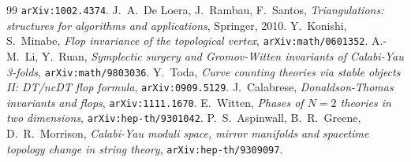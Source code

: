 \documentclass[11pt]{article}
\begin{document}
{\begin{thebibliography}{99}
\texttt{arXiv:1002.4374}.
 J.~A.~De Loera, J.~Rambau, F.~Santos, \textit{Triangulations: structures for
algorithms and applications}, Springer, 2010.
 Y.~Konishi, S.~Minabe, \textit{Flop invariance of the topological vertex},
\texttt{arXiv:math/0601352}.
 A.-M.~Li, Y.~Ruan, \textit{Symplectic surgery and Gromov-Witten invariants of
Calabi-Yau 3-folds},
\texttt{arXiv:math/9803036}.
 Y.~Toda, \textit{Curve counting theories via stable objects II: DT/ncDT flop
formula},
\texttt{arXiv:0909.5129}.
 J.~Calabrese, \textit{Donaldson-Thomas invariants and flops},
\texttt{arXiv:1111.1670}.
 E.~Witten, \textit{Phases of $N=2$ theories in two dimensions},
\texttt{arXiv:hep-th/9301042}.
 P.~S.~Aspinwall, B.~R.~Greene, D.~R.~Morrison, \textit{Calabi-Yau moduli space,
mirror manifolds and spacetime topology change in string theory},
\texttt{arXiv:hep-th/9309097}.
\end{thebibliography}}
\end{document}
